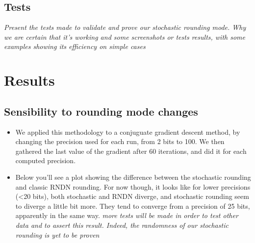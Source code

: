 \documentclass[a4paper,11pt]{article}
\begin{document}
\subsection{Tests}
\emph{Present the tests made to validate and prove our stochastic rounding mode. Why we are certain that it's working and some screenshots or tests results, with some examples showing its efficiency on simple cases}

\section{Results}
\subsection{Sensibility to rounding mode changes}
\begin{itemize}
  \item We applied this methodology to a conjuguate gradient descent method, by changing the precision used for each run, from 2 bits to 100. We then gathered the last value of the gradient after 60 iterations, and did it for each computed precision. 
  \item Below you'll see a plot showing the difference between the stochastic rounding and classic RNDN rounding. For now though, it looks like for lower precisions (<20 bits), both stochastic and RNDN diverge, and stochastic rounding seem to diverge a little bit more. They tend to converge from a precision of 25 bits, apparently in the same way. \emph{more tests will be made in order to test other data and to assert this result. Indeed, the randomness of our stochastic rounding is yet to be proven} %
\end{itemize}
\end{document}
